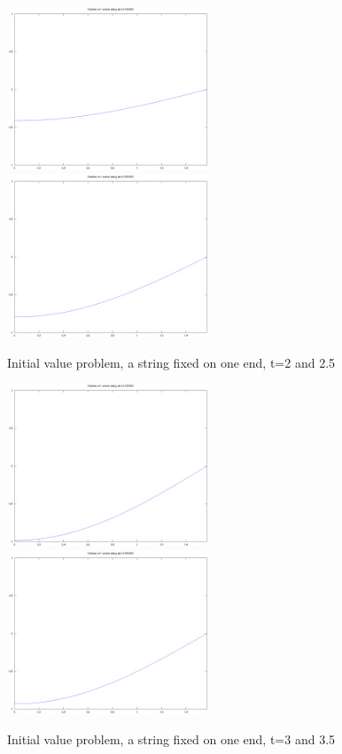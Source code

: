 \documentclass[a4paper,10pt]{report}
\begin{document}
\begin{figure}
 \includegraphics[width=6cm]{./one_fixed_end_analytic_t2.000000.eps}
\includegraphics[width=6cm]{./one_fixed_end_analytic_t2.500000.eps}

\caption{Initial value problem, a string fixed on one end, t=2 and 2.5}

\end{figure} 

\begin{figure}
 \includegraphics[width=6cm]{./one_fixed_end_analytic_t3.000000.eps}
\includegraphics[width=6cm]{./one_fixed_end_analytic_t3.500000.eps}

\caption{Initial value problem, a string fixed on one end, t=3 and 3.5}

\end{figure} 
\end{document}
